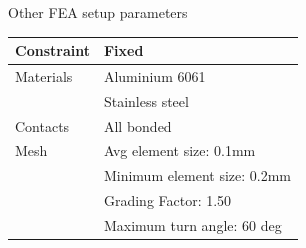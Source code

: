 \begin{center}
\begin{table}[!h]
\caption[FEA Setup]{Other FEA setup parameters}
\centering
\end{table}
\begin{tabular}{|l|l|}
\hline
Constraint & Fixed\\
\hline
Materials & Aluminium 6061\\
 & Stainless steel\\
\hline
Contacts & All bonded\\
\hline
Mesh& Avg element size: 0.1mm\\
& Minimum element size: 0.2mm\\
& Grading Factor: 1.50\\
& Maximum turn angle: 60 deg\\
\hline
\end{tabular}
\end{center}
